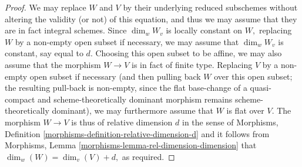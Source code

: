 \documentclass[10pt,a4paper]{amsart}
\theoremstyle{plain}
\theoremstyle{definition}
\theoremstyle{remark}
\numberwithin{equation}{subsection}
\begin{document}
\begin{proof}
\medskip\noindent
We may replace $W$ and $V$ by their underlying reduced subschemes
without altering the validity (or not) of this equation,
and thus we may assume that they are in fact integral schemes.
Since $\dim_w W_v$ is locally constant on $W,$ replacing $W$
by a non-empty open subset if necessary, we may assume that $\dim_w W_v$
is constant, say equal to $d$.  Choosing this open subset to be affine,
we may also assume that the morphism $W\to V$ is in fact of finite type.
Replacing $V$ by a non-empty open subset if necessary
(and then pulling back $W$ over this open subset; the resulting pull-back
is non-empty, since the flat base-change of a quasi-compact
and scheme-theoretically
dominant morphism remains scheme-theoretically dominant),
we may furthermore assume that $W$ is flat over $V$.
The morphism $W\to V$ is thus of relative dimension $d$
in the sense of
Morphisms, Definition
\ref{morphisms-definition-relative-dimension-d}
and it follows from
Morphisms, Lemma \ref{morphisms-lemma-rel-dimension-dimension}
that $\dim_w(W) = \dim_v(V) + d,$ as required.
\end{proof}
\end{document}
